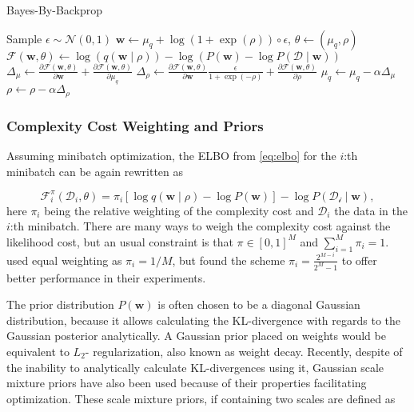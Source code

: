 	
	\begin{algorithm}[h]
		\caption{Bayes-By-Backprop}
		\label{alg:bbb}
		\begin{algorithmic}[1]
			\State Sample $\epsilon \sim \mathcal{N}(0,1)$ 
			\State $ \pmb{w} \gets \mu_q + \log(1 + \exp(\rho)) \circ  \epsilon$, $\theta \gets (\mu_q, \rho)$ 
			\State $\mathcal{F}(\pmb{w}, \theta) \gets \log(q(\pmb{w}\mid \rho)) - \log(P(\pmb{w}) - \log P(\mathcal{D} \mid \pmb{w}))$ 
			\State $\Delta_\mu  \gets \frac{\partial \mathcal{F}(\pmb{w},\theta)}{\partial \pmb{w}} + 
			\frac{\partial \mathcal{F}(\pmb{w},\theta)}{\partial \mu_q}$ 
			\State $\Delta_\rho  \gets \frac{\partial \mathcal{F}(\pmb{w},\theta)}{\partial \pmb{w}}\frac{\epsilon}{1 + \exp(-\rho)} +
			\frac{\partial \mathcal{F}(\pmb{w},\theta)}{\partial \rho}$
			\State $\mu_q \gets \mu_q - \alpha \Delta_\mu$ 
			\State $\rho \gets \rho - \alpha \Delta_\rho$ 
		\end{algorithmic}
	\end{algorithm}
	
	\subsubsection*{Complexity Cost Weighting and Priors}
	
	Assuming minibatch optimization, the ELBO from \eqref{eq:elbo} for the $i$:th minibatch can be again rewritten as 
	
	\begin{equation}
		\mathcal{F}^\pi_i(\mathcal{D}_i, \theta) = \pi_i 
		\left[
		\log q(\pmb{w}\mid \rho) - \log P(\pmb{w}) \right] - \log P(\mathcal{D_i} \mid \pmb{w})
		,
	\end{equation}
	here $\pi_i$ being the relative weighting of the complexity cost and $\mathcal{D}_i$ the data  in the $i$:th minibatch. 
	There are many ways to weigh the complexity cost against the likelihood cost, but an usual constraint is that $\pi \in [0,1]^M$ and $\sum_{i=1}^{M} \pi_i = 1$. \citet{graves_practical_2011} used equal weighting as $\pi_i = 1/M$, but \citet{blundell_weight_2015} found the scheme $\pi_i =\frac{2^{M-i}}{2^M - 1}$ to offer better performance in their experiments. 

	
	The prior distribution $P(\pmb{w})$ is often chosen to be a diagonal Gaussian distribution, because it allows calculating the KL-divergence with regards to the Gaussian posterior analytically. A Gaussian prior placed on weights would be equivalent to $L_2$- regularization, also known as weight decay. Recently, despite of the inability to analytically calculate KL-divergences using it, Gaussian scale mixture priors have also been used \cite{blundell_weight_2015, shridhar_comprehensive_2019} because of their properties facilitating optimization. These scale mixture priors, if containing two scales are defined as 
	
